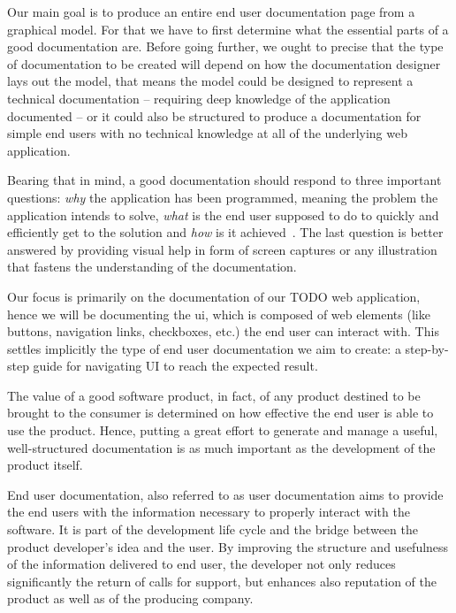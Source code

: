 Our main goal is to produce an entire end user documentation page from a graphical model. For that we have to first determine what the essential parts of a good documentation are. Before going further, we ought to precise that the type of documentation to be created will depend on how the documentation designer lays out the model, that means the model could be designed to represent a technical documentation -- requiring deep knowledge of the application documented -- or it could also be structured to produce a documentation for simple end users with no technical knowledge at all of the underlying web application.

Bearing that in mind, a good documentation should respond to three important questions: \textit{why} the application has been programmed, meaning the problem the application intends to solve, \textit{what} is the end user supposed to do to quickly and efficiently get to the solution and \textit{how} is it achieved~\cite{ISO-IEC-IEEE}. The last question is better answered by providing visual help in form of screen captures or any illustration that fastens the understanding of the documentation.


Our focus is primarily on the documentation of our TODO web application, hence we will be documenting the \acrfull{ui}, which is composed of web elements (like buttons, navigation links, checkboxes, etc.) the end user can interact with. This settles implicitly the type of end user documentation we aim to create: a step-by-step guide for navigating UI to reach the expected result. 

The value of a good software product, in fact, of any product destined to be brought to the consumer is determined on how effective the end user is able to use the product. Hence, putting a great effort to generate and manage a useful, well-structured documentation is as much important as the development of the product itself.

End user documentation, also referred to as user documentation aims to provide the end users with the information necessary to properly interact with the software. It is part of the development life cycle and the bridge between the product developer's idea and the user. By improving the structure and usefulness of the information delivered to end user, the developer not only reduces significantly the return of calls for support, but enhances also reputation of the product as well as of the producing company\cite{ISO-IEC-IEEE}.

